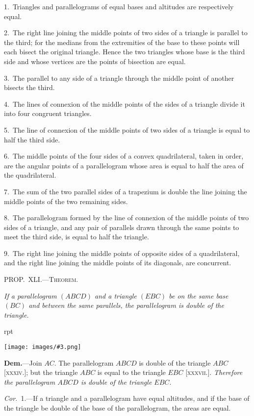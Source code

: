 \documentclass[oneside]{book}
\newcounter{wrapwidth}
\newcommand\mypropl[2]{
\bigskip\Needspace*{4\baselineskip}\begin{center}\textsc{#1}\end{center}
\hspace{\parindent}\emph{#2}\par\medskip
}
\newcommand\imgflow[3]{
\setcounter{wrapwidth}{#1}
\begin{wrapfigure}[#2]{r}{\value{wrapwidth}pt}
\begin{center}
\vspace{-0.3in}
\texttt{[image: images/\#3.png]}
\end{center}
\end{wrapfigure}
}
\begin{document}
\begin{footnotesize}
1.~Triangles and parallelograms of equal bases and altitudes
are respectively equal.

2.~The right line joining the middle points of two sides of a
triangle is parallel to the third; for the medians from the extremities
of the base to these points will each bisect the original
triangle. Hence the two triangles whose base is the third side
and whose vertices are the points of bisection are equal.

3.~The parallel to any side of a triangle through the middle
point of another bisects the third.

4.~The lines of connexion of the middle points of the sides of
a triangle divide it into four congruent triangles.

5.~The line of connexion of the middle points of two sides of
a triangle is equal to half the third side.

6.~The middle points of the four sides of a convex quadrilateral,
taken in order, are the angular points of a parallelogram whose
area is equal to half the area of the quadrilateral.

7.~The sum of the two parallel sides of a trapezium is double
the line joining the middle points of the two remaining sides.

8.~The parallelogram formed by the line of connexion of the
middle points of two sides of a triangle, and any pair of parallels
drawn through the same points to meet the third side, is equal to
half the triangle.

9.~The right line joining the middle points of opposite sides
of a quadrilateral, and the right line joining the middle points
of its diagonals, are concurrent.
\par\end{footnotesize}


\mypropl{PROP\@.~XLI\@.---Theorem.}{If a parallelogram $(ABCD)$ and a triangle $(EBC)$ be
on the same base $(BC)$ and between the same parallels, the
parallelogram is double of the triangle.}

\imgflow{128}{8}{f061}

\textbf{Dem.}---Join $AC$. The parallelogram $ABCD$ is double
of the triangle $ABC$ [\textsc{xxxiv}.];
but the triangle $ABC$ is equal
to the triangle $EBC$ [\textsc{xxxvii}.].
\emph{Therefore the parallelogram
$ABCD$ is double of the triangle
$EBC$.}

\textit{Cor.}~1.---If a triangle and
a parallelogram have equal altitudes, and if the base
of the triangle be double of the base of the parallelogram,
the areas are equal.
\end{document}
